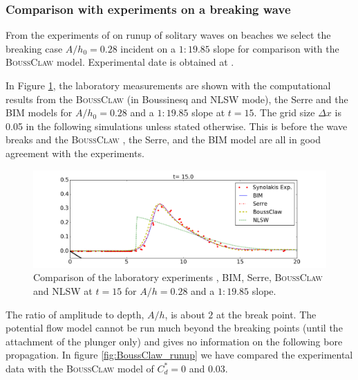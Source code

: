 \documentclass[review]{elsarticle}
\newcommand{\BoussClaw}{\textsc{BoussClaw} }
\begin{document}
\subsubsection{Comparison with experiments on a breaking wave}
\label{sec:wave_break}

From the experiments of \citet{synolakis1987runup} on runup of solitary
waves on beaches we select the breaking case $A/h_0=0.28$ 
incident on  a  $1:19.85$ slope for comparison with the \BoussClaw model. 
Experimental date is obtained at \cite{synolakis2007standards}.



In Figure \ref{fig:lab_bim}, the laboratory measurements
are shown with the computational results from the \BoussClaw (in Boussinesq and  NLSW mode),  the Serre and the BIM models
for $A/h_0=0.28$ and a $1:19.85$ slope at $t=15$. 
The grid size $\Delta x$ is 0.05 in the following simulations
unless stated otherwise.
This is before the wave breaks and
the \BoussClaw, the Serre, and the  BIM model are all in good agreement with the experiments.


\begin{figure}[!htb]
\centering
\includegraphics[width=\textwidth]{_fig/lab_bim_bouss_t15.png}
\caption{Comparison of the laboratory experiments \citep{synolakis1987runup}, BIM, Serre, \BoussClaw and NLSW at $t=15$ for $A/h=0.28$ 
and a $1:19.85$ slope.}
\label{fig:lab_bim}
\end{figure}

The ratio of amplitude to depth, $A/h$, 
is about $2$ at the break point.
The potential flow model cannot be run much beyond the
breaking points (until the attachment of the plunger only) and 
gives no information on the following bore propagation.
In figure \ref{fig:BoussClaw_runup} we have compared
the experimental data with the \BoussClaw model 
of $C_d^* = 0$ and $0.03$.
\end{document}
